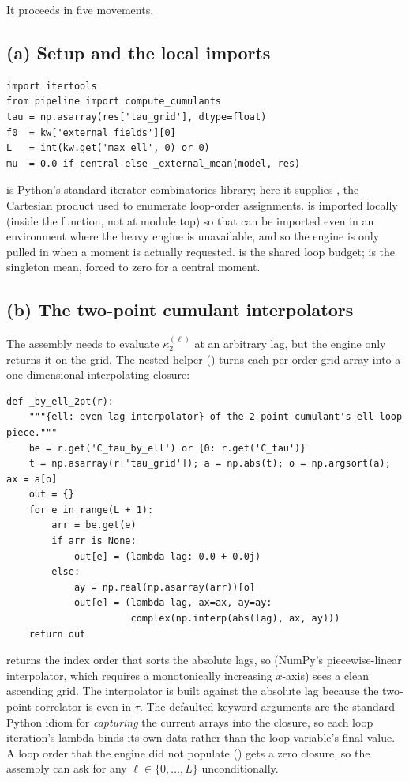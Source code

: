 It proceeds in five movements.

\subsection*{(a) Setup and the local imports}

\begin{lstlisting}
import itertools
from pipeline import compute_cumulants
tau = np.asarray(res['tau_grid'], dtype=float)
f0  = kw['external_fields'][0]
L   = int(kw.get('max_ell', 0) or 0)
mu  = 0.0 if central else _external_mean(model, res)
\end{lstlisting}

 is Python's standard iterator-combinatorics library; here it
supplies , the Cartesian product used to enumerate
loop-order assignments.  is imported locally (inside the
function, not at module top) so that  can be imported even in an
environment where the heavy engine is unavailable, and so the engine is only
pulled in when a moment is actually requested.  is the shared loop budget;
 is the singleton mean, forced to zero for a central moment.

\subsection*{(b) The two-point cumulant interpolators}

The assembly needs to evaluate $\kappa_2^{(\ell)}$ at an arbitrary lag, but the
engine only returns it on the grid. The nested helper 
() turns each per-order grid array into a
one-dimensional interpolating closure:

\begin{lstlisting}
def _by_ell_2pt(r):
    """{ell: even-lag interpolator} of the 2-point cumulant's ell-loop piece."""
    be = r.get('C_tau_by_ell') or {0: r.get('C_tau')}
    t = np.asarray(r['tau_grid']); a = np.abs(t); o = np.argsort(a); ax = a[o]
    out = {}
    for e in range(L + 1):
        arr = be.get(e)
        if arr is None:
            out[e] = (lambda lag: 0.0 + 0.0j)
        else:
            ay = np.real(np.asarray(arr))[o]
            out[e] = (lambda lag, ax=ax, ay=ay:
                      complex(np.interp(abs(lag), ax, ay)))
    return out
\end{lstlisting}

 returns the index order that sorts the absolute lags, so
 (NumPy's piecewise-linear interpolator, which requires a
monotonically increasing $x$-axis) sees a clean ascending grid. The interpolator
is built against the absolute lag because the two-point correlator is even in
$\tau$. The defaulted keyword arguments  are the standard
Python idiom for \emph{capturing} the current arrays into the closure, so each
loop iteration's lambda binds its own data rather than the loop variable's final
value. A loop order that the engine did not populate () gets a
zero closure, so the assembly can ask for any $\ell\in\{0,\ldots,L\}$
unconditionally.

